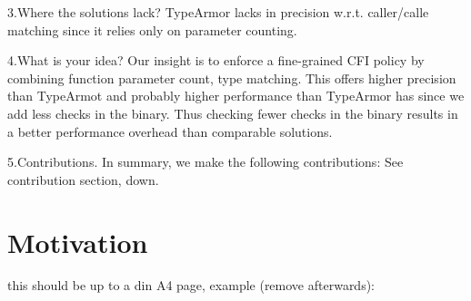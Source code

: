 
3.Where the solutions lack?
TypeArmor lacks in precision w.r.t. caller/calle matching since it relies only on parameter counting.

4.What is your idea?
Our insight is to enforce a fine-grained CFI policy by combining function parameter count, type matching.
This offers higher precision than TypeArmot and probably higher performance than TypeArmor has since we 
add less checks in the binary. Thus checking fewer checks in the binary results in a better performance 
overhead than comparable solutions.

5.Contributions.
In summary, we make the following contributions:
See contribution section, down.

%  
%  
%  
%  

\section{Motivation}
\label{Motivation}

this should be up to a din A4 page, example (remove afterwards):

